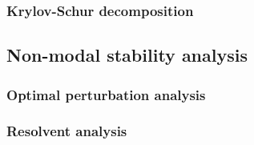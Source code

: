     \subsubsection{Krylov-Schur decomposition}





  \subsection{Non-modal stability analysis}

    \subsubsection{Optimal perturbation analysis}

    \subsubsection{Resolvent analysis}
